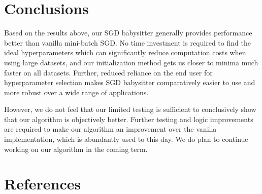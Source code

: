 \documentclass{article}
\begin{document}
\section{Conclusions}
\par Based on the results above, our SGD babysitter generally provides performance better than vanilla mini-batch SGD. No time investment is required to find the ideal hyperparameters which can significantly reduce computation costs when using large datasets, and our initialization method gets us closer to minima much faster on all datasets. Further, reduced reliance on the end user for hyperparameter selection makes SGD babysitter comparatively easier to use and more robust over a wide range of applications. 

\par However, we do not feel that our limited testing is sufficient to conclusively show that our algorithm is objectively better. Further testing and logic improvements are required to make our algorithm an improvement over the vanilla implementation, which is abundantly used to this day. We do plan to continue working on our algorithm in the coming term.
 
\newpage
\section{References}
\end{document}
